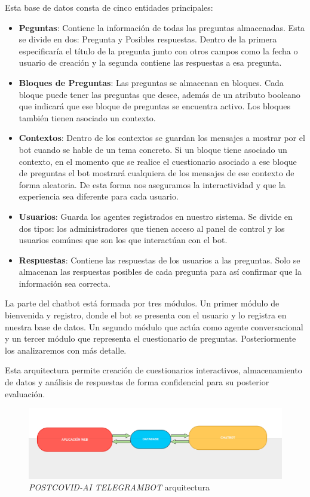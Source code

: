 Esta base de datos consta de cinco entidades principales:
\begin{itemize}
\item \textbf{Peguntas}: Contiene la información de todas las preguntas almacenadas. Esta se divide en dos: Pregunta y Posibles respuestas. Dentro de la primera especificaría el título de la pregunta junto con otros campos como la fecha o usuario de creación y la segunda contiene las respuestas a esa pregunta. 
\item \textbf{Bloques de Preguntas}: Las preguntas se almacenan en bloques. Cada bloque puede tener las preguntas que desee, además de un atributo booleano que indicará que ese bloque de preguntas se encuentra activo. Los bloques también tienen asociado un contexto. 
\item \textbf{Contextos}: Dentro de los contextos se guardan los mensajes a mostrar por el bot cuando se hable de un tema concreto. Si un bloque tiene asociado un contexto, en el momento que se realice el cuestionario asociado a ese bloque de preguntas el bot mostrará cualquiera de los mensajes de ese contexto de forma aleatoria. De esta forma nos aseguramos la interactividad y que la experiencia sea diferente para cada usuario.
\item \textbf{Usuarios}: Guarda los agentes registrados en nuestro sistema. Se divide en dos tipos: los administradores que tienen acceso al panel de control y los usuarios comúnes que son los que interactúan con el bot.
\item \textbf{Respuestas}: Contiene las respuestas de los usuarios a las preguntas. Solo se almacenan las respuestas posibles de cada pregunta para así confirmar que la información sea correcta.
\end{itemize}

La parte del chatbot está formada por tres módulos. Un primer módulo de bienvenida y registro, donde el bot se presenta con el usuario y lo registra en nuestra base de datos. Un segundo módulo que actúa como agente conversacional y un tercer módulo que representa el cuestionario de preguntas. Posteriormente los analizaremos con más detalle.

Esta arquitectura permite creación de cuestionarios interactivos, almacenamiento de datos y análisis de respuestas de forma confidencial para su posterior evaluación.

\begin{figure}[h]
    \centering
    \includegraphics[width=1\textwidth]{imagenes/arquitecture.png}
    \caption{\textit{POSTCOVID-AI TELEGRAMBOT} arquitectura}
    \label{fig:enter-label}
\end{figure}

